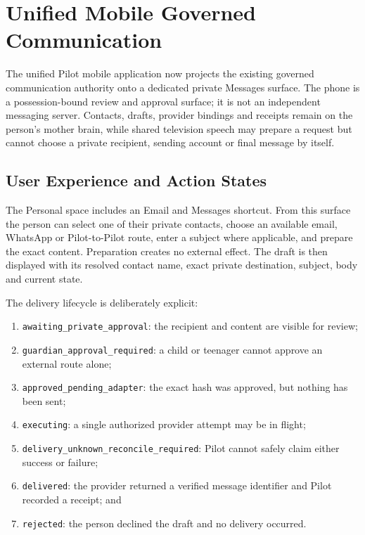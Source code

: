 \section{Unified Mobile Governed Communication}
\label{sec:pilot-unified-mobile-communication}

The unified Pilot mobile application now projects the existing governed communication authority
onto a dedicated private Messages surface.  The phone is a possession-bound review and approval
surface; it is not an independent messaging server.  Contacts, drafts, provider bindings and
receipts remain on the person's mother brain, while shared television speech may prepare a request
but cannot choose a private recipient, sending account or final message by itself.

\subsection{User Experience and Action States}

The Personal space includes an Email and Messages shortcut.  From this surface the person can
select one of their private contacts, choose an available email, WhatsApp or Pilot-to-Pilot route,
enter a subject where applicable, and prepare the exact content.  Preparation creates no external
effect.  The draft is then displayed with its resolved contact name, exact private destination,
subject, body and current state.

The delivery lifecycle is deliberately explicit:
\begin{enumerate}
  \item \texttt{awaiting\_private\_approval}: the recipient and content are visible for review;
  \item \texttt{guardian\_approval\_required}: a child or teenager cannot approve an external route alone;
  \item \texttt{approved\_pending\_adapter}: the exact hash was approved, but nothing has been sent;
  \item \texttt{executing}: a single authorized provider attempt may be in flight;
  \item \texttt{delivery\_unknown\_reconcile\_required}: Pilot cannot safely claim either success or failure;
  \item \texttt{delivered}: the provider returned a verified message identifier and Pilot recorded a receipt; and
  \item \texttt{rejected}: the person declined the draft and no delivery occurred.
\end{enumerate}

